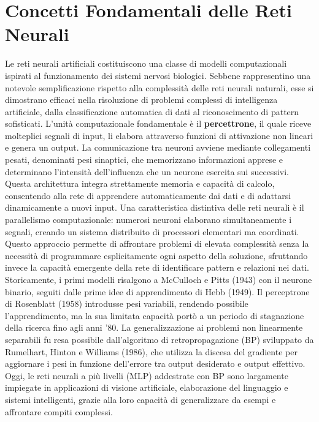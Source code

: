 \section{Concetti Fondamentali delle Reti Neurali}
    Le reti neurali artificiali costituiscono una classe di modelli computazionali ispirati al funzionamento dei sistemi nervosi biologici. Sebbene rappresentino una notevole semplificazione rispetto alla complessità delle reti neurali naturali, esse si dimostrano efficaci nella risoluzione di problemi complessi di intelligenza artificiale, dalla classificazione automatica di dati al riconoscimento di pattern sofisticati.
    L'unità computazionale fondamentale è il \textbf{percettrone}, il quale riceve molteplici segnali di input, li elabora attraverso funzioni di attivazione non lineari e genera un output. La comunicazione tra neuroni avviene mediante collegamenti pesati, denominati pesi sinaptici, che memorizzano informazioni apprese e determinano l'intensità dell'influenza che un neurone esercita sui successivi. Questa architettura integra strettamente memoria e capacità di calcolo, consentendo alla rete di apprendere automaticamente dai dati e di adattarsi dinamicamente a nuovi input.
    Una caratteristica distintiva delle reti neurali è il parallelismo computazionale: numerosi neuroni elaborano simultaneamente i segnali, creando un sistema distribuito di processori elementari ma coordinati. Questo approccio permette di affrontare problemi di elevata complessità senza la necessità di programmare esplicitamente ogni aspetto della soluzione, sfruttando invece la capacità emergente della rete di identificare pattern e relazioni nei dati.
    Storicamente, i primi modelli risalgono a McCulloch e Pitts (1943) con il neurone binario, seguiti dalle prime idee di apprendimento di Hebb (1949). Il perceptrone di Rosenblatt (1958) introdusse pesi variabili, rendendo possibile l'apprendimento, ma la sua limitata capacità portò a un periodo di stagnazione della ricerca fino agli anni '80. La generalizzazione ai problemi non linearmente separabili fu resa possibile dall'algoritmo di retropropagazione (BP) sviluppato da Rumelhart, Hinton e Williams (1986), che utilizza la discesa del gradiente per aggiornare i pesi in funzione dell'errore tra output desiderato e output effettivo.
    Oggi, le reti neurali a più livelli (MLP) addestrate con BP sono largamente impiegate in applicazioni di visione artificiale, elaborazione del linguaggio e sistemi intelligenti, grazie alla loro capacità di generalizzare da esempi e affrontare compiti complessi.


